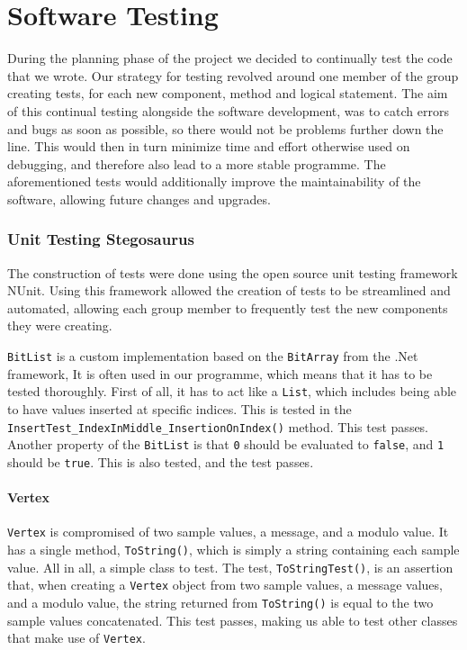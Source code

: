 \section{Software Testing}
During the planning phase of the project we decided to continually test the code that we wrote.
Our strategy for testing revolved around one member of the group creating tests, for each new component, method and logical statement.
The aim of this continual testing alongside the software development, was to catch errors and bugs as soon as possible, so there would not be problems further down the line.
This would then in turn minimize time and effort otherwise used on debugging, and therefore also lead to a more stable programme.
The aforementioned tests would additionally improve the maintainability of the software, allowing future changes and upgrades.
\nopagebreak


\subsubsection{Unit Testing Stegosaurus}
The construction of tests were done using the open source unit testing framework NUnit.
Using this framework allowed the creation of tests to be streamlined and automated, allowing each group member to frequently test the new components they were creating.

\lstinline|BitList| is a custom implementation based on the \lstinline|BitArray| from the .Net framework, 
It is often used in our programme, which means that it has to be tested thoroughly.
First of all, it has to act like a \lstinline|List|, which includes being able to have values inserted at specific indices.
This is tested in the \lstinline|InsertTest_IndexInMiddle_InsertionOnIndex()| method.
This test passes.\\
Another property of the \lstinline|BitList| is that \lstinline|0| should be evaluated to \lstinline|false|, and \lstinline|1| should be \lstinline|true|.
This is also tested, and the test passes.

\paragraph*{Vertex}
\lstinline|Vertex| is compromised of two sample values, a message, and a modulo value.
It has a single method, \lstinline|ToString()|, which is simply a string containing each sample value.
All in all, a simple class to test.
The test, \lstinline|ToStringTest()|, is an assertion that, when creating a \lstinline|Vertex| object from two sample values, a message values, and a modulo value, the string returned from \lstinline|ToString()| is equal to the two sample values concatenated.
This test passes, making us able to test other classes that make use of \lstinline|Vertex|.

